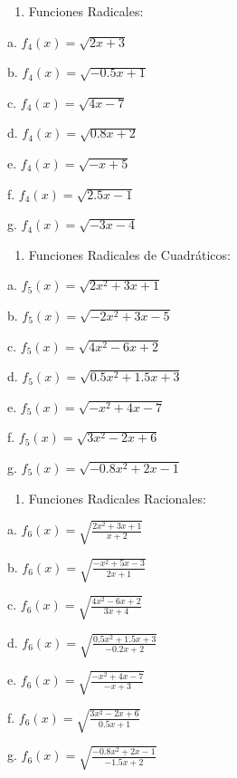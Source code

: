\documentclass[]{book}
\providecommand{\tightlist}{%
  \setlength{\itemsep}{0pt}\setlength{\parskip}{0pt}}
\begin{document}
\begin{enumerate}
\def\labelenumi{\arabic{enumi}.}
\setcounter{enumi}{3}
\tightlist
\item
  Funciones Radicales:
\end{enumerate}

\begin{multicols}{2}
    a. $f_4(x) = \sqrt{2x + 3}$
    
    b. $f_4(x) = \sqrt{-0.5x + 1}$
    
    c. $f_4(x) = \sqrt{4x - 7}$
    
    d. $f_4(x) = \sqrt{0.8x + 2}$
    
    e. $f_4(x) = \sqrt{-x + 5}$
    
    f. $f_4(x) = \sqrt{2.5x - 1}$
    
    g. $f_4(x) = \sqrt{-3x - 4}$
\end{multicols}

\begin{enumerate}
\def\labelenumi{\arabic{enumi}.}
\setcounter{enumi}{4}
\tightlist
\item
  Funciones Radicales de Cuadráticos:
\end{enumerate}

\begin{multicols}{2}  
    a. $f_5(x) = \sqrt{2x^2 + 3x + 1}$
    
    b. $f_5(x) = \sqrt{-2x^2 + 3x - 5}$
    
    c. $f_5(x) = \sqrt{4x^2 - 6x + 2}$
    
    d. $f_5(x) = \sqrt{0.5x^2 + 1.5x + 3}$
    
    e. $f_5(x) = \sqrt{-x^2 + 4x - 7}$
    
    f. $f_5(x) = \sqrt{3x^2 - 2x + 6}$
    
    g. $f_5(x) = \sqrt{-0.8x^2 + 2x - 1}$
\end{multicols}

\begin{enumerate}
\def\labelenumi{\arabic{enumi}.}
\setcounter{enumi}{5}
\tightlist
\item
  Funciones Radicales Racionales:
\end{enumerate}

\begin{multicols}{2}  
    a. $f_6(x) = \sqrt{\frac{2x^2 + 3x + 1}{x + 2}}$
    
    b. $f_6(x) = \sqrt{\frac{-x^2 + 5x - 3}{2x + 1}}$
    
    c. $f_6(x) = \sqrt{\frac{4x^2 - 6x + 2}{3x + 4}}$
    
    d. $f_6(x) = \sqrt{\frac{0.5x^2 + 1.5x + 3}{-0.2x + 2}}$
    
    e. $f_6(x) = \sqrt{\frac{-x^2 + 4x - 7}{-x + 3}}$
    
    f. $f_6(x) = \sqrt{\frac{3x^2 - 2x + 6}{0.5x + 1}}$
    
    g. $f_6(x) = \sqrt{\frac{-0.8x^2 + 2x - 1}{-1.5x + 2}}$
\end{multicols}
\end{document}
